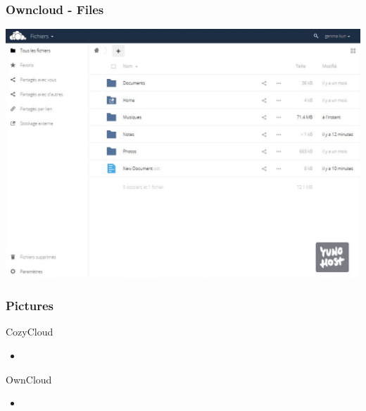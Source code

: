 \documentclass{beamer}
\begin{document}
\begin{frame}
\frametitle{Owncloud - Files}
\includegraphics[scale=0.3] {./Owncloud/Owncloud_Fichiers.jpg}
\end{frame}

\begin{frame}
\frametitle{Pictures}

\begin{block}{CozyCloud}
\begin{itemize}
\item 
\end{itemize}
\end{block}

\begin{block}{OwnCloud}
\begin{itemize}
\item 
\end{itemize}
\end{block}
\end{frame}
\end{document}
